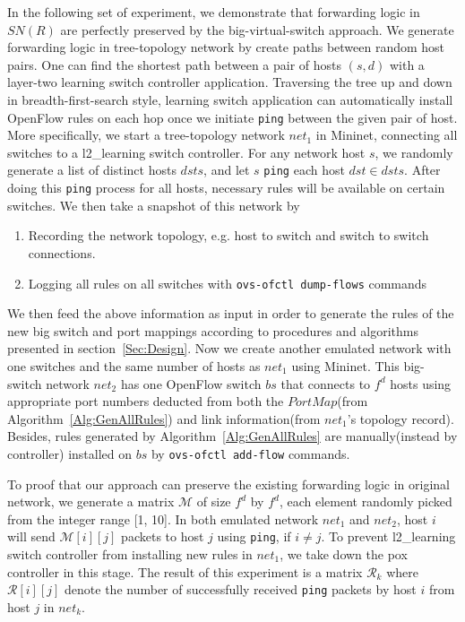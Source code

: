 In the following set of experiment, we demonstrate that forwarding logic in $SN(R)$ are
perfectly preserved by the big-virtual-switch approach.
We generate forwarding logic in tree-topology network by create paths between random host pairs.
One can find the shortest path between a pair of hosts $(s, d)$ with
a layer-two learning switch controller application.
Traversing the tree up and down in breadth-first-search style, learning switch application
can automatically install OpenFlow rules on each hop once we initiate \texttt{ping} between
the given pair of host.
More specifically, we start a tree-topology network $net_1$ in Mininet\cite{Mininet},
connecting all switches to a l2\_learning switch controller\cite{Pox}.
For any network host $s$, we randomly generate a list of distinct hosts $dsts$,
and let $s$ \texttt{ping} each host $dst \in dsts$.
After doing this \texttt{ping} process for all hosts, necessary rules will be available on
certain switches.
We then take a snapshot of this network by
\begin{enumerate}
\item Recording the network topology, e.g. host to switch and switch to switch connections.
\item Logging all rules on all switches with \texttt{ovs-ofctl dump-flows} commands
\end{enumerate}
We then feed the above information as input in order to generate the rules of the new big switch
and port mappings according to procedures and algorithms presented in section~\ref{Sec:Design}.
Now we create another emulated network with one switches and
the same number of hosts as $net_1$ using Mininet.
This big-switch network $net_2$ has one OpenFlow switch $bs$ that connects to $f^d$ hosts using
appropriate port numbers deducted from both the $PortMap$(from Algorithm~\ref{Alg:GenAllRules})
and link information(from $net_1$'s topology record).
Besides, rules generated by Algorithm~\ref{Alg:GenAllRules} are manually(instead by controller)
installed on $bs$ by \texttt{ovs-ofctl add-flow} commands.

To proof that our approach can preserve the existing forwarding logic in original network,
we generate a matrix $\mathcal{M}$ of size $f^d$ by $f^d$, each element randomly picked
from the integer range [1, 10].
In both emulated network $net_1$ and $net_2$, host $i$ will send $\mathcal{M}[i][j]$
packets to host $j$ using \texttt{ping}, if $i \neq j$.
To prevent l2\_learning switch controller from installing new rules in $net_1$, we take down
the pox controller in this stage.
The result of this experiment is a matrix $\mathcal{R}_k$ where $\mathcal{R}[i][j]$ denote
the number of successfully received \texttt{ping} packets by host $i$ from host $j$ in $net_k$.


